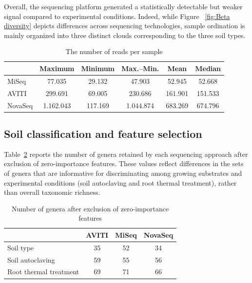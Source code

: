 \documentclass[12pt]{article}
\theoremstyle{thmstyleone}%
\theoremstyle{thmstyletwo}%
\theoremstyle{thmstylethree}%
\begin{document}
Overall, the sequencing platform generated a statistically detectable but weaker signal compared to experimental conditions. Indeed, while Figure ~\ref{fig:Beta diversity} depicts differences across sequencing technologies, sample ordination is mainly organized into three distinct clouds corresponding to the three soil types.





\begin{table}[htbp]
\caption{The number of reads per sample}\label{tab:reads}%
\begin{tabular*}{\textwidth}{@{\extracolsep{\fill}}lccccc}
\toprule
 & Maximum & Minimum & Max.--Min. & Mean & Median \\
\midrule
MiSeq & 77.035 & 29.132 & 47.903 & 52.945 & 52.668 \\ 
AVITI & 299.691 & 69.005 & 230.686 & 161.901 & 151.533 \\ 
NovaSeq & 1.162.043 & 117.169 & 1.044.874 & 683.269 & 674.796 \\ 
\hline
\end{tabular*}
\end{table}



\subsection{Soil classification and feature selection}
Table~\ref{tab:feature-counts} reports the number of genera retained by each sequencing approach after exclusion of zero-importance features. These values reflect differences in the sets of genera that are informative for discriminating among growing substrates and experimental conditions (soil autoclaving and root thermal treatment), rather than overall taxonomic richness.

\begin{table}[htbp]
\caption{Number of genera after exclusion of zero-importance features}\label{tab:feature-counts}%
\begin{tabular*}{\textwidth}{@{\extracolsep{\fill}}lccc}
\toprule
 & AVITI & MiSeq & NovaSeq \\
\midrule
Soil type & 35 & 52 & 34 \\ 
Soil autoclaving & 59 & 55 & 56 \\ 
Root thermal treatment & 69 & 71 & 66 \\ 
\hline
\end{tabular*}
\end{table}
\end{document}

